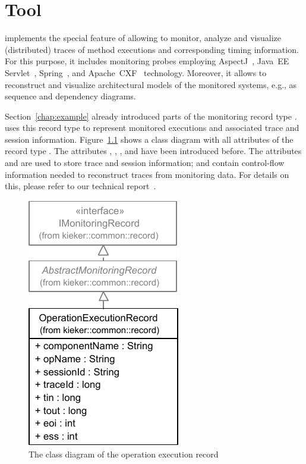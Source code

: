 % 

\chapter{\KiekerTraceAnalysis{} Tool}\label{chap:aspectJ}

\KiekerTraceAnalysis{} implements the special feature of \Kieker{} allowing to %
monitor, analyze and visualize (distributed) traces of method executions and %
corresponding timing information. For this purpose, it includes monitoring probes employing %
AspectJ~\cite{AspectJ-WebSite}, Java~EE Servlet~\cite{JavaServletTechnology-WebSite}, %
Spring~\cite{Spring-WebSite}, and Apache~CXF~\cite{CXF-WebSite} technology. %
Moreover, it allows to reconstruct and visualize architectural models of the %
monitored systems, e.g., as sequence and dependency diagrams. %

Section~\ref{chap:example} already introduced parts of the monitoring record %
type . \KiekerTraceAnalysis{} uses this record %
type to represent monitored executions and associated trace and session information. %
Figure~\ref{fig:OperationExecutionRecordClassDiagramComplete} shows a class diagram %
with all attributes of the record type . %
The attributes , , %
, and  have been introduced before. %
The attributes  and  are used to store %
trace and session information;  and  contain control-flow %
information needed to reconstruct traces from monitoring data. %
For details on this, please refer to our technical %
report~\cite{vanHoornRohrHasselbringWallerEhlersFreyKieselhorst2009TRContinuousMonitoringOfSoftwareServicesDesignAndApplicationOfTheKiekerFramework}.

\begin{figure}[hb]\centering
\includegraphics[scale=0.8]{images/kieker_OperationExecutionRecord-complete-modified}%
\caption{The class diagram of the operation execution record}
\label{fig:OperationExecutionRecordClassDiagramComplete}
\end{figure}

